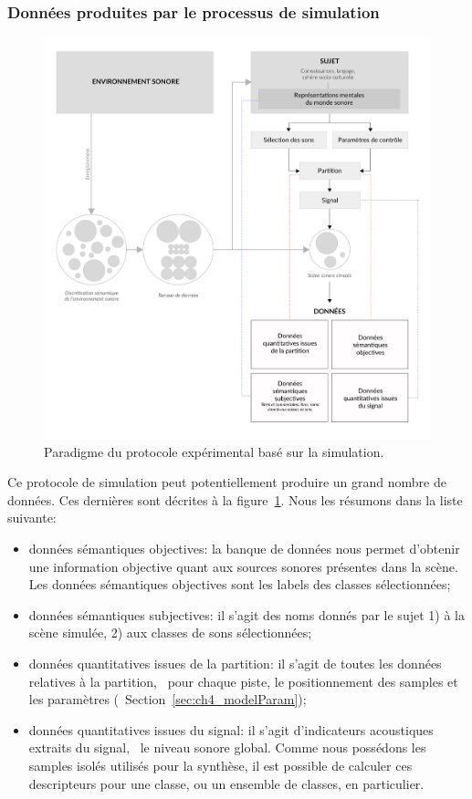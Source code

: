 \subsubsection{Données produites par le processus de simulation}

\begin{figure}[t]
        \myfloatalign
        \includegraphics[width=.8\linewidth]{gfx/ch_4/schemaXP}
       \caption{Paradigme du protocole expérimental basé sur la simulation.}\label{fig:paradigmeSimu2}
\end{figure}

Ce protocole de simulation peut potentiellement produire un grand nombre de données. Ces dernières sont décrites à la figure~\ref{fig:paradigmeSimu2}.  Nous les résumons dans la liste suivante:

\begin{itemize}
\item données sémantiques objectives: la banque de données nous permet d'obtenir une information objective quant aux sources sonores présentes dans la scène. Les données sémantiques objectives sont les labels des classes sélectionnées;
\item données sémantiques subjectives: il s'agit des noms donnés par le sujet 1) à la scène simulée, 2) aux classes de sons sélectionnées;
\item données quantitatives issues de la partition: il s'agit de toutes les données relatives à la partition, \ie~pour chaque piste, le positionnement des samples et les paramètres (\cf~Section~\ref{sec:ch4_modelParam});
\item données quantitatives issues du signal: il s'agit d'indicateurs acoustiques extraits du signal, \eg~le niveau sonore global. Comme nous possédons les samples isolés utilisés pour la synthèse, il est possible de calculer ces descripteurs pour une classe, ou un ensemble de classes, en particulier.
\end{itemize}

